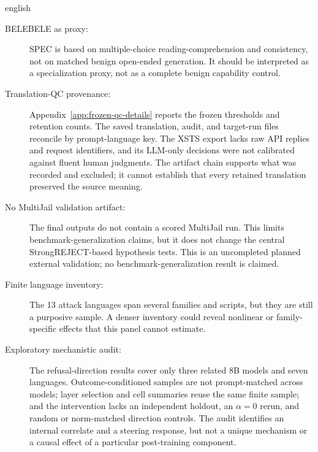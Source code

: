 \begin{otherlanguage*}{english}
\begin{description}
    \item[BELEBELE as proxy:] SPEC is based on multiple-choice reading-comprehension and consistency, not on matched benign open-ended generation. It should be interpreted as a specialization proxy, not as a complete benign capability control.

    \item[Translation-QC provenance:] Appendix~\ref{app:frozen-qc-details} reports the frozen thresholds and retention counts. The saved translation, audit, and target-run files reconcile by prompt-language key. The XSTS export lacks raw API replies and request identifiers, and its LLM-only decisions were not calibrated against fluent human judgments. The artifact chain supports what was recorded and excluded; it cannot establish that every retained translation preserved the source meaning.

    \item[No MultiJail validation artifact:] The final outputs do not contain a scored MultiJail run. This limits benchmark-generalization claims, but it does not change the central StrongREJECT-based hypothesis tests. This is an uncompleted planned external validation; no benchmark-generalization result is claimed.

    \item[Finite language inventory:] The 13 attack languages span several families and scripts, but they are still a purposive sample. A denser inventory could reveal nonlinear or family-specific effects that this panel cannot estimate.

    \item[Exploratory mechanistic audit:] The refusal-direction results cover only three related 8B models and seven languages. Outcome-conditioned samples are not prompt-matched across models; layer selection and cell summaries reuse the same finite sample; and the intervention lacks an independent holdout, an $\alpha=0$ rerun, and random or norm-matched direction controls. The audit identifies an internal correlate and a steering response, but not a unique mechanism or a causal effect of a particular post-training component.
\end{description}

\end{otherlanguage*}
